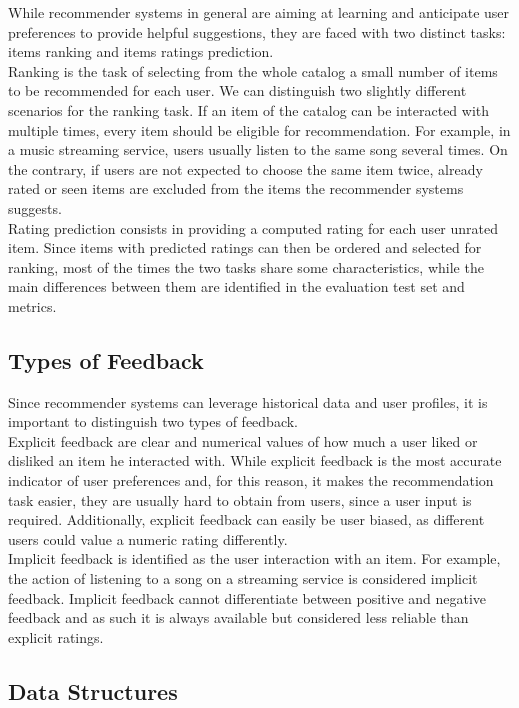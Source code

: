 While recommender systems in general are aiming at learning and anticipate user preferences to provide helpful suggestions, they are faced with two distinct tasks: items ranking and items ratings prediction.\\
Ranking is the task of selecting from the whole catalog a small number of items to be recommended for each user. We can distinguish two slightly different scenarios for the ranking task. If an item of the catalog can be interacted with multiple times, every item should be eligible for recommendation. For example, in a music streaming service, users usually listen to the same song several times. On the contrary, if users are not expected to choose the same item twice, already rated or seen items are excluded from the items the recommender systems suggests.\\
Rating prediction consists in providing a computed rating for each user unrated item. Since items with predicted ratings can then be ordered and selected for ranking, most of the times the two tasks share some characteristics, while the main differences between them are identified in the evaluation test set and metrics.


\subsection{Types of Feedback}

Since recommender systems can leverage historical data and user profiles, it is important to distinguish two types of feedback.\\
Explicit feedback are clear and numerical values of how much a user liked or disliked an item he interacted with. While explicit feedback is the most accurate indicator of user preferences and, for this reason, it makes the recommendation task easier, they are usually hard to obtain from users, since a user input is required. Additionally, explicit feedback can easily be user biased, as different users could value a numeric rating differently.\\
Implicit feedback is identified as the user interaction with an item. For example, the action of listening to a song on a streaming service is considered implicit feedback.
Implicit feedback cannot differentiate between positive and negative feedback and as such it is always available but considered less reliable than explicit ratings.


\subsection{Data Structures}

